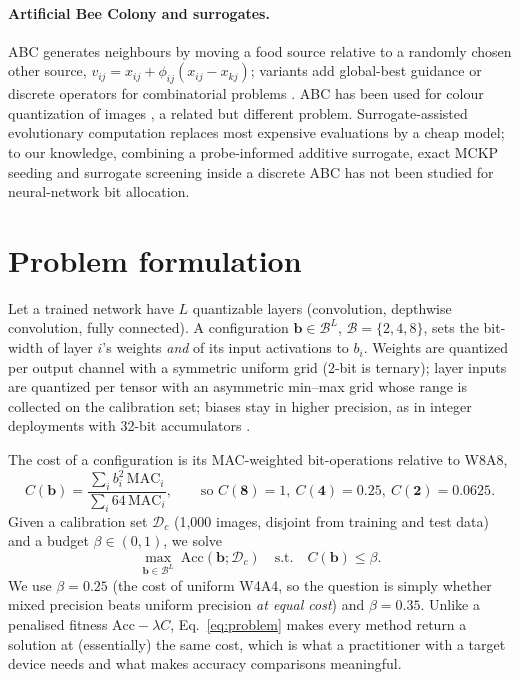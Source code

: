 \documentclass[11pt,a4paper]{article}
\newcommand{\B}{\mathcal{B}}
\begin{document}
\paragraph{Artificial Bee Colony and surrogates.} ABC \citep{Karaboga2007,Karaboga2009} generates
neighbours by moving a food source relative to a randomly chosen other source,
$v_{ij}=x_{ij}+\phi_{ij}(x_{ij}-x_{kj})$; variants add global-best guidance \citep{Zhu2010GABC} or
discrete operators for combinatorial problems \citep{Pan2011DABC,Kashan2012DisABC}. ABC has been used
for colour quantization of images \citep{Ozturk2014Color}, a related but different problem.
Surrogate-assisted evolutionary computation \citep{Jin2011Surrogate,Jones1998EGO} replaces most
expensive evaluations by a cheap model; to our knowledge, combining a probe-informed additive
surrogate, exact MCKP seeding and surrogate screening inside a discrete ABC has not been studied for
neural-network bit allocation.

\section{Problem formulation}
\label{sec:problem}

Let a trained network have $L$ quantizable layers (convolution, depthwise convolution, fully
connected). A configuration $\mathbf b\in\B^L$, $\B=\{2,4,8\}$, sets the bit-width of layer $i$'s
weights \emph{and} of its input activations to $b_i$. Weights are quantized per output channel with
a symmetric uniform grid (2-bit is ternary); layer inputs are quantized per tensor with an asymmetric
min--max grid whose range is collected on the calibration set; biases stay in higher precision, as in
integer deployments with 32-bit accumulators \citep{Jacob2018}.

The cost of a configuration is its MAC-weighted bit-operations relative to W8A8,
\begin{equation}
  C(\mathbf b)=\frac{\sum_i b_i^2\,\mathrm{MAC}_i}{\sum_i 64\,\mathrm{MAC}_i},\qquad
  \text{so } C(\mathbf 8)=1,\ C(\mathbf 4)=0.25,\ C(\mathbf 2)=0.0625 .
\end{equation}
Given a calibration set $\mathcal D_c$ (1{,}000 images, disjoint from training and test data) and a
budget $\beta\in(0,1)$, we solve
\begin{equation}
  \max_{\mathbf b\in\B^L}\ \mathrm{Acc}(\mathbf b;\mathcal D_c)\quad\text{s.t.}\quad C(\mathbf b)\le\beta .
  \label{eq:problem}
\end{equation}
We use $\beta=0.25$ (the cost of uniform W4A4, so the question is simply whether mixed precision
beats uniform precision \emph{at equal cost}) and $\beta=0.35$. Unlike a penalised fitness
$\mathrm{Acc}-\lambda C$, Eq.~\eqref{eq:problem} makes every method return a solution at
(essentially) the same cost, which is what a practitioner with a target device needs and what makes
accuracy comparisons meaningful.
\end{document}
